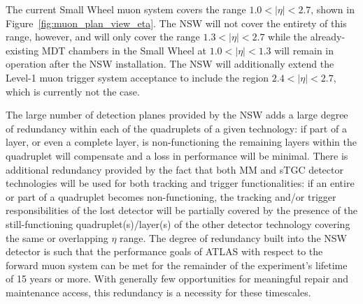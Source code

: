 The current Small Wheel muon system covers the range $1.0 < \lvert \eta \rvert < 2.7$, shown
in Figure~\ref{fig:muon_plan_view_eta}.
The NSW will not cover the entirety of this range, however, and will only cover the
range $1.3 < \lvert \eta \rvert < 2.7$ while the already-existing MDT chambers in the Small Wheel at $1.0 < \lvert \eta  \rvert < 1.3$
will remain in operation after the NSW installation.
The NSW will additionally extend the Level-1 muon trigger system acceptance to include
the region $2.4 < \lvert \eta \rvert < 2.7$, which is currently not the case.

The large number of detection planes provided by the NSW adds a large degree of redundancy
within each of the quadruplets of a given technology: if part of a layer, or even a complete layer,
is non-functioning the remaining layers within the quadruplet will compensate and a loss in performance
will be minimal.
There is additional redundancy provided by the fact that both MM and sTGC detector technologies
will be used for both tracking and trigger functionalities: if an entire or part of a quadruplet
becomes non-functioning, the tracking and/or trigger responsibilities of the lost detector
will be partially covered by the presence of the still-functioning quadruplet(s)/layer(s) of the other
detector technology covering the same or overlapping
$\eta$ range.
The degree of redundancy built into the NSW detector is such that the performance goals
of ATLAS with respect to the forward muon system can be met for the remainder of the experiment's
lifetime of 15 years or more.
With generally few opportunities for meaningful repair and maintenance access, this redundancy is
a necessity for these timescales.

